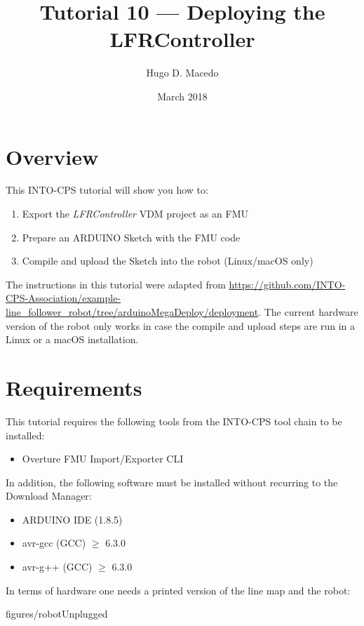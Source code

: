 \documentclass[11pt,a4paper]{../tutorial}
\title{Tutorial 10 --- Deploying the LFRController}
\date{March 2018}
\author{Hugo D. Macedo}
\begin{document}
\section*{Overview}

This INTO-CPS tutorial will show you how to:

\begin{enumerate}[noitemsep]

\item Export the \emph{LFRController} VDM project as an FMU
\item Prepare an ARDUINO Sketch with the FMU code 
\item Compile and upload the Sketch into the robot (Linux/macOS only)
\end{enumerate}

The instructions in this tutorial were adapted from \url{https://github.com/INTO-CPS-Association/example-line\_follower_robot/tree/arduinoMegaDeploy/deployment}. The current hardware version of the robot only works in case the compile and upload steps are run in a Linux or a macOS installation. 

\section*{Requirements}

This tutorial requires the following tools from the INTO-CPS tool chain to be installed:

\begin{itemize}[noitemsep]
\item Overture FMU Import/Exporter CLI
\end{itemize}

In addition, the following software must be installed without recurring to the Download Manager: 

\begin{itemize}[noitemsep]
\item ARDUINO IDE (1.8.5) 
\item avr-gcc (GCC) $\geq$ 6.3.0
\item avr-g++ (GCC) $\geq$ 6.3.0   
\end{itemize}

In terms of hardware one needs a printed version of the line map and the robot:

\begin{annotation}[width=0.85\linewidth,trim={20cm 20cm 20cm 20cm},clip]{figures/robotUnplugged}
\end{annotation}
\end{document}
